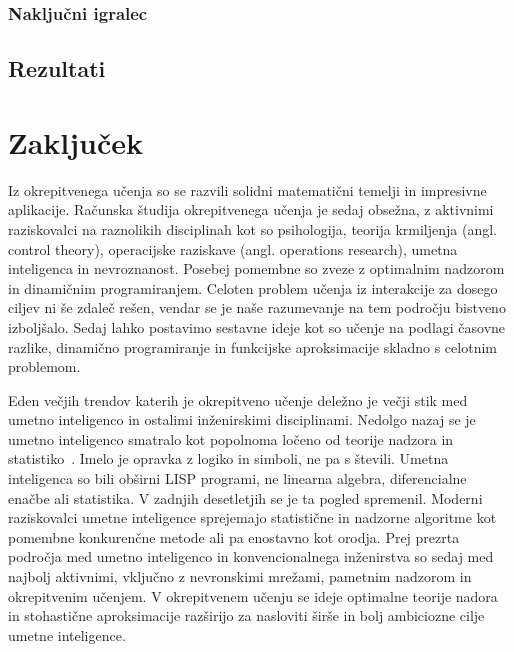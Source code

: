 \documentclass[a4paper, oneside, 12pt]{report}
\begin{document}
\subsection{Naključni igralec}
\section{Rezultati}

\chapter{Zaključek} \label{chapter:Conclusion}
\thispagestyle{fancy}
Iz okrepitvenega učenja so se razvili solidni matematični temelji in impresivne aplikacije. Računska študija okrepitvenega učenja je sedaj obsežna, z aktivnimi raziskovalci na raznolikih disciplinah kot so psihologija, teorija krmiljenja (angl. control theory), operacijske raziskave (angl. operations research), umetna inteligenca in nevroznanost. Posebej pomembne so zveze z optimalnim nadzorom in dinamičnim programiranjem. Celoten problem učenja iz interakcije za dosego ciljev ni še zdaleč rešen, vendar se je naše razumevanje na tem področju bistveno izboljšalo. Sedaj lahko postavimo sestavne ideje kot so učenje na podlagi časovne razlike, dinamično programiranje in funkcijske aproksimacije skladno s celotnim problemom.

Eden večjih trendov katerih je okrepitveno učenje deležno je večji stik med umetno inteligenco in ostalimi inženirskimi disciplinami. Nedolgo nazaj se je umetno inteligenco smatralo kot popolnoma ločeno od teorije nadzora in statistiko~\cite{ReinforcementLearningAnIntroduction}. Imelo je opravka z logiko in simboli, ne pa s števili. Umetna inteligenca so bili obširni LISP programi, ne linearna algebra, diferencialne enačbe ali statistika. V zadnjih desetletjih se je ta pogled spremenil. Moderni raziskovalci umetne inteligence sprejemajo statistične in nadzorne algoritme kot pomembne konkurenčne metode ali pa enostavno kot orodja. Prej prezrta področja med umetno inteligenco in konvencionalnega inženirstva so sedaj med najbolj aktivnimi, vključno z nevronskimi mrežami, pametnim nadzorom in okrepitvenim učenjem. V okrepitvenem učenju se ideje optimalne teorije nadora in stohastične aproksimacije razširijo za nasloviti širše in bolj ambiciozne cilje umetne inteligence.
\end{document}
